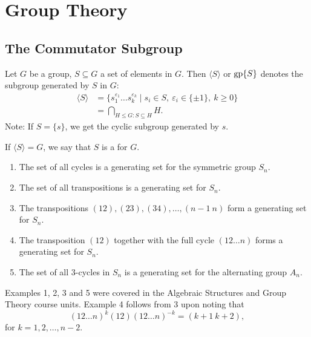 \section{Group Theory}
\subsection{The Commutator Subgroup}
Let $G$ be a group, $S \subseteq G$ a set of elements in $G$. Then $\langle S \rangle$ or $\operatorname{gp}\{S\}$ denotes the subgroup generated by $S$ in $G$:
\begin{align*}
	\langle S \rangle &= \{s_1^{\varepsilon_1} \dots s_k^{\varepsilon_k} \mid s_i \in S,\ \varepsilon_i \in \{\pm 1\},\ k \geq 0\} \\
		& = \bigcap_{H \leq G : S \subseteq H}{H}.
\end{align*}
Note: If $S = \{s\}$, we get the cyclic subgroup generated by $s$.

If $\langle S \rangle = G$, we say that $S$ is a  for $G$.

\begin{examples}\hfill
	\begin{enumerate}
		\item The set of all cycles is a generating set for the symmetric group $S_n$.
		\item The set of all transpositions is a generating set for $S_n$.
		\item The transpositions $(12), (23), (34), \dots, (n - 1\ n)$ form a generating set for $S_n$.
		\item The transposition $(12)$ together with the full cycle $(12 \dots n)$ forms a generating set for $S_n$.
		\item The set of all $3$-cycles in $S_n$ is a generating set for the alternating group $A_n$.
	\end{enumerate}
	Examples 1, 2, 3 and 5 were covered in the Algebraic Structures and Group Theory course units. Example 4 follows from 3 upon noting that
	\[
		(12 \dots n)^k (12) (12 \dots n)^{-k} = (k + 1\ k + 2),
	\]
	for $k = 1, 2, \dots, n - 2$.
\end{examples}

